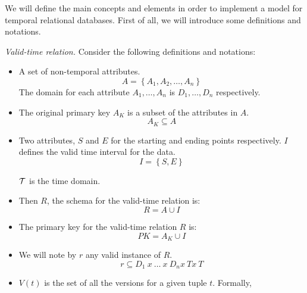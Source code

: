 We will define the main concepts and elements in order to implement a model for temporal relational databases. First of all, we will introduce some definitions and notations.



\begin{definition}
\label{def:valid-time-relation}
\emph{Valid-time relation.}
Consider the following definitions and notations:

\begin{itemize}
 \item A set of non-temporal attributes.
	\begin{equation}
	\label{eq:attribute-set}
	A = \left \lbrace A_1, A_2, \ldots, A_n \right \rbrace
	\end{equation}
      The domain for each attribute $A_1, \ldots, A_n$ is $D_1, \ldots, D_n$ respectively. 
\item The original primary key $A_K$ is a subset of the attributes in $A$.
      \begin{equation}
       \label{eq:primary-key-a}
      A_K \subseteq A
      \end{equation}
\item Two attributes, $S$  and $E$ for the starting and ending points respectively. $I$ defines the valid time interval for the data. 
\begin{equation}
 \label{eq:attribute-time-interval}
I = \left \lbrace S, E \right \rbrace
\end{equation}

$\mathcal{T}$ is the time domain.

\item Then $R$, the schema for the valid-time relation is:
\begin{equation}
 \label{eq:valid-time-relation}
R = A \cup  I
\end{equation}
\item The primary key for the valid-time relation $R$ is:
\begin{equation}
 \label{eq:valid-time-temporal-pk}
PK = A_K \cup I
\end{equation}


\item We will note by $r$ any valid instance of $R$. 
      \begin{equation}
       \label{eq:valid-time-instance}
      r \subseteq D_1\ x\ \ldots\ x\ D_n x\ T x\ T
      \end{equation}


\item $V(t)$ is the set of all the versions for a given tuple $t$. Formally,


\end{itemize}
\end{definition}

